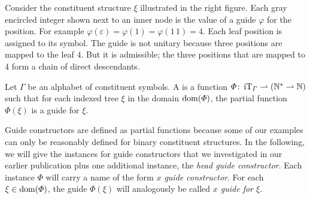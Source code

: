 \documentclass[../../document.tex]{subfiles}
\begin{document}
    \bigskip

    \begin{wrapfigure}[6]{r}{.3\linewidth}
        
    \end{wrapfigure}
    \parexample*
    Consider the constituent structure \(\xi\) illustrated in the right figure.
    Each gray encircled integer shown next to an inner node is the value of a guide \(\varphi\) for the position.
    For example \(\varphi(\varepsilon) = \varphi(1) = \varphi(1\,1) = 4\).
    Each leaf position is assigned to its symbol.
    The guide is not unitary because three positions are mapped to the leaf $4$.
    But it is admissible; the three positions that are mapped to 4 form a chain of direct descendants.
    \hfill\exampleqed

    \begin{definition}
        Let \(\varGamma\) be an alphabet of constituent symbols.
        A  is a function \(\varPhi\colon \operatorname{iT}_\varGamma \rightharpoonup (\mathbb{N}^* \rightharpoonup \mathbb{N})\) such that for each indexed tree \(\xi\) in the domain \(\operatorname{dom}(\varPhi)\), the partial function \(\varPhi(\xi)\) is a guide for \(\xi\).
    \end{definition}

    Guide constructors are defined as partial functions because some of our examples can only be reasonably defined for binary constituent structures.
    In the following, we will give the instances for guide constructors that we investigated in our earlier publication \citep{Rup22} plus one additional instance, the \emph{head guide constructor}.
    Each instance \(\varPhi\) will carry a name of the form \emph{\(x\) guide constructor}.
    For each \(\xi \in \operatorname{dom}(\varPhi)\), the guide \(\varPhi(\xi)\) will analogously be called \emph{\(x\) guide for \(\xi\)}.
\end{document}
